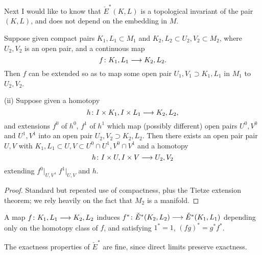 \documentclass[../main]{subfiles}
\begin{document}
Next I would like to know that $\check{E}^*(K,L)$ is a topological invariant of the pair $(K,L)$, and does not depend on the embedding in $M$.
\begin{lemma}[i]\label{lem:p3c10.2}

Suppose given compact pairs $K_1,L_1 \subset M_1$ and $K_2,L_2 \subset U_2,V_2 \subset M_2$, where $U_2,V_2$ is an open pair, and a continuous map
\[f \colon K_1,L_1 \longrightarrow K_2,L_2.\]
Then $f$ can be extended so as to map some open pair $U_1,V_1 \supset K_1,L_1$ in $M_1$ to $U_2,V_2$.

(ii) Suppose given a homotopy 
\[h \colon I \times K_1,I \times L_1 \longrightarrow K_2,L_2,\]
and extensions $f^0$ of $h^0$, $f^1$ of $h^1$ which map (possibly different) open pairs $U^0,V^0$ and $U^1,V^1$ into an open pair $U_2,V_2 \supset K_2,L_2$. Then there exists an open pair pair $U,V$ with $K_1,L_1 \subset U,V \subset U^0 \cap U^1,V^0 \cap V^1$ and a homotopy 
\[h \colon I \times U, I \times V \longrightarrow U_2,V_2\]
extending $f^0|_{U,V}$, $f^1|_{U,V}$ and $h$.
\end{lemma}
\begin{proof}
Standard but repeated use of compactness, plus the Tietze extension theorem; we rely heavily on the fact that $M_2$ is a manifold.
\end{proof}
\begin{corollary}\label{cor:p3c10.3}
A map $f \colon K_1 , L_1 \longrightarrow K_2,L_2$ induces $f^* \colon \check{E}^*(K_2,L_2) \longrightarrow \check{E}^*(K_1,L_1)$ depending only on the homotopy class of $f$, and satisfying $1^* = 1$, $(fg)^* = g^* f^*$.
\end{corollary}

The exactness properties of $\check{E}^*$ are fine, since direct limits preserve exactness.
\end{document}
